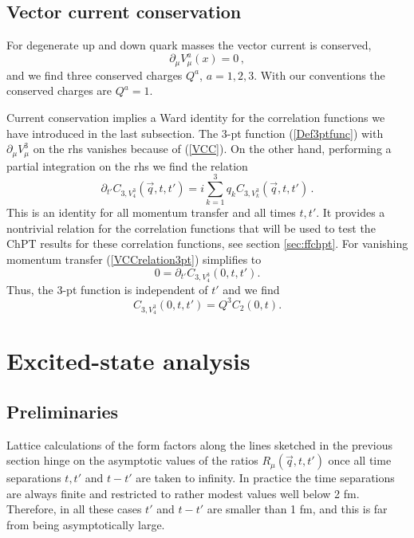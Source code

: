 \documentclass[11pt,prd,aps,showpacs,eqsecnum,floatfix,nofootinbib,preprint,tightenlines]{revtex4}
\newcommand{\pref}[1]{(\ref{#1})}
\begin{document}
\subsection{Vector current conservation}
For degenerate up and down quark masses the vector current is conserved,
\begin{equation}\label{VCC}
\partial_{\mu}V^a_{\mu}(x) = 0\,,
\end{equation}
and we find three conserved charges $Q^a$, $a=1,2,3$. 
With our conventions the conserved charges are $Q^a=1$.

Current conservation implies a Ward identity for the correlation functions we have introduced in the last subsection. The 3-pt function \pref{Def3ptfunc} with $\partial_{\mu} V_{\mu}^3$ on the rhs vanishes because of \pref{VCC}. On the other hand, performing a partial integration on the rhs we find the relation
\begin{equation}\label{VCCrelation3pt}
\partial_{t'} C_{3,V^3_{4}}(\vec{q},t,t') = i \sum_{k=1}^3 q_k C_{3,V^3_{k}}(\vec{q},t,t')\,.
\end{equation}
This is an identity for all momentum transfer and all times $t,t'$. It  provides a nontrivial relation for the correlation functions  that will be used to test the ChPT results for these correlation functions, see section \ref{sec:ffchpt}. 
For vanishing momentum transfer \pref{VCCrelation3pt}  simplifies to
\begin{equation}\label{VCCrelation3ptZERO}
0 = \partial_{t'} C_{3,V^3_{4}}(0,t,t').
\end{equation}
Thus, the 3-pt function is independent of $t'$ and we find
\begin{equation}\label{VCCrelation3ptZERO2}
 C_{3,V^3_{4}}(0,t,t') = Q^3  C_{2}(0,t).
\end{equation}

\section{Excited-state analysis}\label{sec:excitedstates} 

\subsection{Preliminaries}

Lattice calculations of the form factors along the lines sketched in the previous section hinge on the asymptotic values of the ratios $R_{\mu}(\vec{q},t,t')$ once all time separations $t,t'$ and $t-t'$ are taken to infinity.  In practice the time separations are always finite and restricted to rather modest values well below 2 fm. Therefore, in all these cases $t'$ and $t-t'$ are smaller than 1 fm, and this is far from being asymptotically large. 
\end{document}
